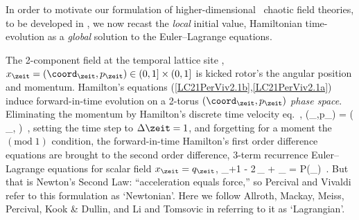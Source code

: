 In order to motivate our formulation of higher-dimensional \spt\ chaotic
field theories, to be developed in , we now recast the
\emph{local} initial value, Hamiltonian time-evolution  as a
\emph{global} solution to the Euler–Lagrange equations.

The 2-component field at the
temporal lattice site \zeit,
\(
\ssp_{\zeit} =(\coord_{\zeit},p_{\zeit}) \in  (0,1]\times(0,1]
\)
is kicked rotor's the angular position and momentum.
Hamilton's equations (\ref{LC21PerViv2.1b},\ref{LC21PerViv2.1a}) induce
for\-ward-in-time evolution on a 2-torus  $(\coord_{\zeit},p_\zeit)$ {\em
phase space}.
Eliminating the momentum by Hamilton's discrete time velocity
eq.~,
\beq
(\coord_\zeit,p_\zeit) =
\left(
    \coord_{\zeit},
\right)
\,,
setting the time step to $\Delta\zeit=1$, and forgetting for a moment
the $(\mbox{mod}\;1)$ condition, the
for\-ward-in-time Hamilton's first order difference equations are brought
to the second order difference, 3-term recurrence Euler–Lagrange equations
for scalar field $\ssp_{\zeit}=q_\zeit$,
\beq
\ssp_{\zeit+1} - 2\,\ssp_{\zeit} + \ssp_{} = P(\ssp_{\zeit})
\,.
But that is Newton's Second Law: ``acceleration equals
force,'' so Percival and Vivaldi refer to this formulation as
`Newtonian'. Here we follow Allroth, Mackay, Meiss,
Percival, Kook \& Dullin,
and Li and Tomsovic in referring  to it as `Lagrangian'.

